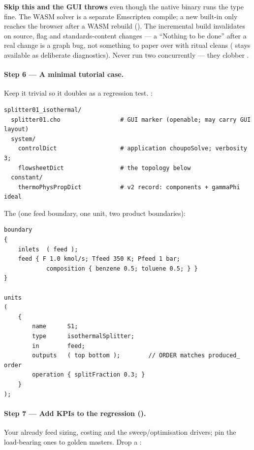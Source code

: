\documentclass[11pt,a4paper]{article}
\begin{document}
\begin{pitfall}
\textbf{Skip this and the GUI throws } even though the native binary runs the type fine.  The
WASM solver is a separate Emscripten compile; a new built-in only reaches the
browser after a WASM rebuild ().  The incremental build
invalidates on source, flag and standards-content changes --- a ``Nothing to
be done'' after a real change is a graph bug, not something to paper over
with ritual cleans ( stays available as deliberate
diagnostics).  Never run two  concurrently --- they clobber
.
\end{pitfall}

\paragraph{Step 6 --- A minimal tutorial case.}  Keep it trivial so it doubles
as a regression test.  :

\begin{lstlisting}
splitter01_isothermal/
  splitter01.cho                 # GUI marker (openable; may carry GUI layout)
  system/
    controlDict                  # application choupoSolve; verbosity 3;
    flowsheetDict                # the topology below
  constant/
    thermoPhysPropDict           # v2 record: components + gammaPhi ideal
\end{lstlisting}

\noindent The  (one feed boundary, one unit, two
product boundaries):

\begin{lstlisting}[language=dict]
boundary
{
    inlets  ( feed );
    feed { F 1.0 kmol/s; Tfeed 350 K; Pfeed 1 bar;
            composition { benzene 0.5; toluene 0.5; } }
}

units
(
    {
        name      S1;
        type      isothermalSplitter;
        in        feed;
        outputs   ( top bottom );        // ORDER matches produced_ order
        operation { splitFraction 0.3; }
    }
);
\end{lstlisting}

\paragraph{Step 7 --- Add KPIs to the regression ().}  Your
 already feed sizing, costing and the sweep/optimisation drivers;
pin the load-bearing ones to golden masters.  Drop a
:
\end{document}
